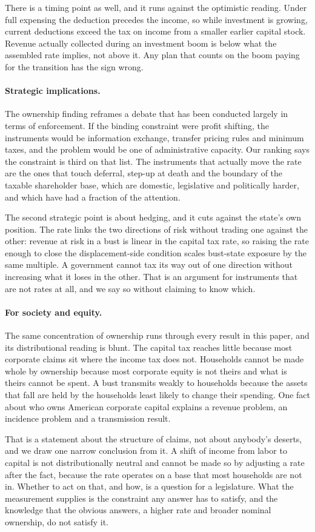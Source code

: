 There is a timing point as well, and it runs against the optimistic reading. Under full expensing
the deduction precedes the income, so while investment is growing, current deductions exceed the
tax on income from a smaller earlier capital stock. Revenue actually collected during an
investment boom is below what the assembled rate implies, not above it. Any plan that counts on
the boom paying for the transition has the sign wrong.

\paragraph{Strategic implications.} The ownership finding reframes a debate that has been
conducted largely in terms of enforcement. If the binding constraint were profit shifting, the
instruments would be information exchange, transfer pricing rules and minimum taxes, and the
problem would be one of administrative capacity. Our ranking says the constraint is third on that
list. The instruments that actually move the rate are the ones that touch deferral, step-up at
death and the boundary of the taxable shareholder base, which are domestic, legislative and
politically harder, and which have had a fraction of the attention.

The second strategic point is about hedging, and it cuts against the state's own position. The
rate links the two directions of risk without trading one against the other: revenue at risk in a
bust is linear in the capital tax rate, so raising the rate enough to close the displacement-side
condition scales bust-state exposure by the same multiple. A government cannot tax its way out of
one direction without increasing what it loses in the other. That is an argument for instruments
that are not rates at all, and we say so without claiming to know which.

\paragraph{For society and equity.} The same concentration of ownership runs through every result
in this paper, and its distributional reading is blunt. The capital tax reaches little because
most corporate claims sit where the income tax does not. Households cannot be made whole by
ownership because most corporate equity is not theirs and what is theirs cannot be spent. A bust
transmits weakly to households because the assets that fall are held by the households least
likely to change their spending. One fact about who owns American corporate capital explains a
revenue problem, an incidence problem and a transmission result.

That is a statement about the structure of claims, not about anybody's deserts, and we draw one
narrow conclusion from it. A shift of income from labor to capital is not distributionally
neutral and cannot be made so by adjusting a rate after the fact, because the rate operates on a
base that most households are not in. Whether to act on that, and how, is a question for a
legislature. What the measurement supplies is the constraint any answer has to satisfy, and the
knowledge that the obvious answers, a higher rate and broader nominal ownership, do not satisfy
it.
